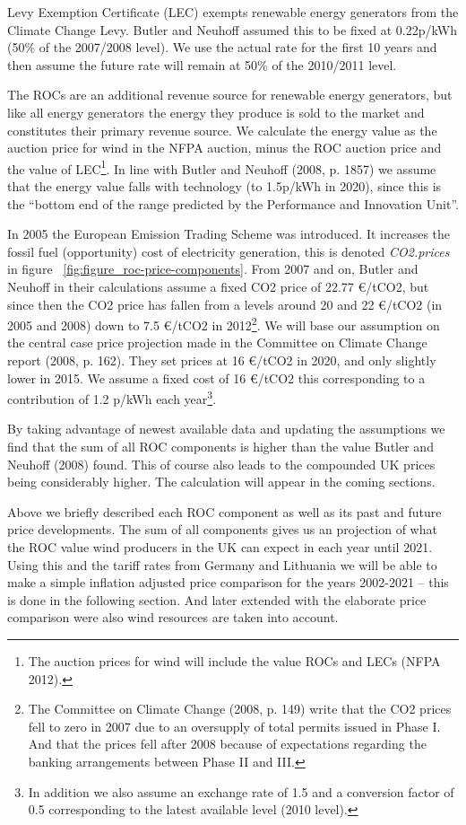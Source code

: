 \documentclass[a4paper, 12pt]{article}
\begin{document}
Levy Exemption Certificate (LEC) exempts renewable energy generators from the Climate Change Levy. Butler and Neuhoff assumed this to be fixed at 0.22p/kWh (50\% of the 2007/2008 level). We use the actual rate for the first 10 years and then assume the future rate will remain at 50\% of the 2010/2011 level.

The ROCs are an additional revenue source for renewable energy generators, but like all energy generators the energy they produce is sold to the market and constitutes their primary revenue source. We calculate the energy value as the auction price for wind in the NFPA auction, minus the ROC auction price and the value of LEC\footnote{The auction prices for wind will include the value ROCs and LECs (NFPA 2012).}. In line with Butler and Neuhoff (2008, p. 1857) we assume that the energy value falls with technology (to 1.5p/kWh in 2020), since this is the ``bottom end of the range predicted by the Performance and Innovation Unit''.

In 2005 the European Emission Trading Scheme was introduced. It increases the fossil fuel (opportunity) cost of electricity generation, this is denoted \emph{CO2.prices} in figure ~\ref{fig:figure_roc-price-components}. From 2007 and on, Butler and Neuhoff in their calculations assume a fixed CO2 price of 22.77 €/tCO2, but since then the CO2 price has fallen from a levels around 20 and 22 €/tCO2 (in 2005 and 2008) down to 7.5 €/tCO2 in 2012\footnote{The Committee on Climate Change (2008, p. 149) write that the CO2 prices fell to zero in 2007 due to an oversupply of total permits issued in Phase I. And that the prices fell after 2008 because of expectations regarding the banking arrangements between Phase II and III.}. We will base our assumption on the central case price projection made in the Committee on Climate Change report (2008, p. 162). They set prices at 16 €/tCO2 in 2020, and only slightly lower in 2015. We assume a fixed cost of 16 €/tCO2 this corresponding to a contribution of 1.2 p/kWh each year\footnote{In addition we also assume an exchange rate of 1.5 and a conversion factor of 0.5 corresponding to the latest available level (2010 level).}.

By taking advantage of newest available data and updating the assumptions we find that the sum of all ROC components is higher than the value Butler and Neuhoff (2008) found. This of course also leads to the compounded UK prices being considerably higher. The calculation will appear in the coming sections. 

Above we briefly described each ROC component as well as its past and future price developments. The sum of all components gives us an projection of what the ROC value wind producers in the UK can expect in each year until 2021. Using this and the tariff rates from Germany and Lithuania we will be able to make a simple inflation adjusted price comparison for the years 2002-2021 – this is done in the following section. And later extended with the elaborate price comparison were also wind resources are taken into account.
\end{document}
